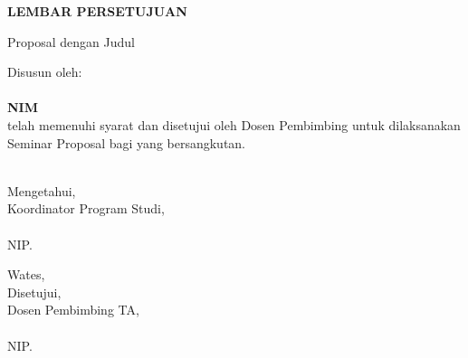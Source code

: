 
\newpage
{}
\begin{center}
    \begin{doublespace}
        \textbf{\large \MakeUppercase{lembar persetujuan}}
    \end{doublespace}
\end{center}

\begin{center}
    Proposal {\tipe} dengan Judul
\end{center}

\begin{center}
    \begin{doublespace}
        \textbf{\large \MakeUppercase {\judulid}}
    \end{doublespace}
\end{center}

\begin{center}
    Disusun oleh:\\
    \textbf{\penulis}\\
    \textbf{NIM \nim}\\[1.5cm]

    telah memenuhi syarat dan disetujui oleh Dosen Pembimbing untuk dilaksanakan Seminar Proposal {\tipe} bagi yang bersangkutan.\\[0.75cm]
\end{center}

\begin{minipage}{0.35\textwidth}
    \hfill\\[2em]
    Mengetahui,\\
    Koordinator Program Studi,\\[2cm]
    \koorprodi\\
    NIP. \NIPkoorprodi
\end{minipage}
\hfill
\begin{minipage}{0.47\textwidth}
    Wates, \tglpersetujuan\\[1em]
    Disetujui,\\
    Dosen Pembimbing TA,\\[2cm]
    \pembimbing\\
    NIP. \NIPpembimbing
\end{minipage}%
